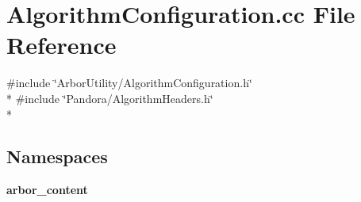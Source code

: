\section{Algorithm\+Configuration.\+cc File Reference}
\label{AlgorithmConfiguration_8cc}
{\ttfamily \#include \char`\"{}Arbor\+Utility/\+Algorithm\+Configuration.\+h\char`\"{}}\\*
{\ttfamily \#include \char`\"{}Pandora/\+Algorithm\+Headers.\+h\char`\"{}}\\*
\subsection*{Namespaces}
\begin{DoxyCompactItemize}
\item 
 {\bf arbor\+\_\+content}
\end{DoxyCompactItemize}
